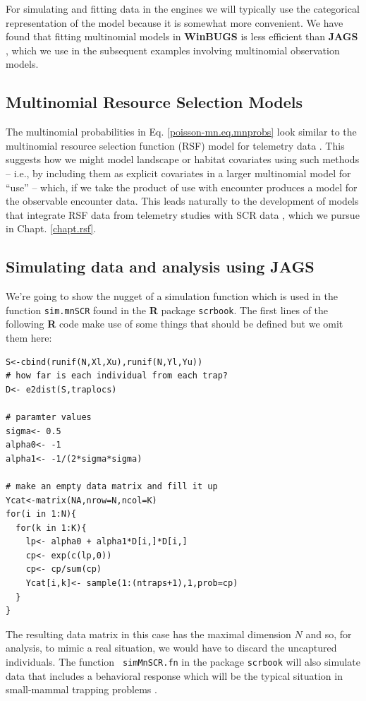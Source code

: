 For simulating and fitting data in the \bugs engines we will typically use
the categorical representation of the model because it is somewhat
more convenient.  We have found that fitting multinomial models in
{\bf WinBUGS} is less efficient than {\bf JAGS}
\citep{converse_royle:2013}, which we use in the subsequent examples
involving multinomial 
observation models.


\subsection{Multinomial  Resource Selection Models}

The multinomial probabilities in Eq. \ref{poisson-mn.eq.mnprobs}
look similar to the 
multinomial resource selection function (RSF) model for telemetry data
\citep{manly_etal:2002, lele_keim:2006}.  This suggests how we might
model landscape or habitat covariates using such methods -- i.e., by
including them as explicit covariates in a larger multinomial model
for ``use'' -- which, if we take the product of use with encounter
produces a model for the observable encounter data. This 
leads naturally to the development of models that integrate RSF data
from telemetry studies with SCR data \citep{royle_chandler:2012},
which we pursue in Chapt. \ref{chapt.rsf}.





\subsection{Simulating data and analysis using JAGS}

We're going to show the nugget of a simulation function which is
used in the function \mbox{\tt sim.mnSCR} found in the {\bf R} package
\mbox{\tt scrbook}.  The first lines of the following {\bf R} code
make use of some things that should be defined but we omit them here:
{\small
\begin{verbatim}
S<-cbind(runif(N,Xl,Xu),runif(N,Yl,Yu))
# how far is each individual from each trap?
D<- e2dist(S,traplocs)

# paramter values
sigma<- 0.5
alpha0<- -1
alpha1<- -1/(2*sigma*sigma)

# make an empty data matrix and fill it up
Ycat<-matrix(NA,nrow=N,ncol=K)
for(i in 1:N){
  for(k in 1:K){
    lp<- alpha0 + alpha1*D[i,]*D[i,]
    cp<- exp(c(lp,0))
    cp<- cp/sum(cp)
    Ycat[i,k]<- sample(1:(ntraps+1),1,prob=cp)
  }
}
\end{verbatim}
}
The resulting data matrix in this case has the maximal dimension $N$
and so, for analysis, to mimic a real situation, we would have to
discard the uncaptured individuals.  The function \mbox{\tt
  simMnSCR.fn} in the package \mbox{\tt scrbook}
will also
simulate data that includes a behavioral response 
 which will be the
typical situation in small-mammal trapping problems
\citep[see][for details]{converse_royle:2012}.



